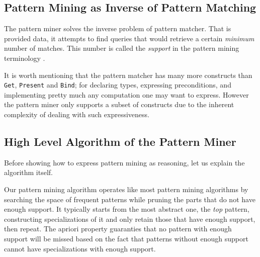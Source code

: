 \documentclass[runningheads]{llncs}
\begin{document}
\subsection{Pattern Mining as Inverse of Pattern Matching}

The pattern miner solves the inverse problem of pattern matcher. That
is provided data, it attempts to find queries that would retrieve a
certain \emph{minimum} number of matches. This number is called the
\emph{support} in the pattern mining terminology \cite{Chi2005Freq,
  Agrawal1994fastalgorithms}.

It is worth mentioning that the pattern matcher has many more
constructs than \texttt{Get}, \texttt{Present} and \texttt{Bind}; for
declaring types, expressing preconditions, and implementing pretty
much any computation one may want to express. However the pattern
miner only supports a subset of constructs due to the inherent
complexity of dealing with such expressiveness.

\subsection{High Level Algorithm of the Pattern Miner}

Before showing how to express pattern mining as reasoning, let us
explain the algorithm itself.

Our pattern mining algorithm operates like most pattern mining
algorithms \cite{Chi2005Freq} by searching the space of frequent
patterns while pruning the parts that do not have enough support. It
typically starts from the most abstract one, the \emph{top} pattern,
constructing specializations of it and only retain those that have
enough support, then repeat. The apriori property
\cite{Agrawal1994fastalgorithms} guaranties that no pattern with
enough support will be missed based on the fact that patterns without
enough support cannot have specializations with enough support.
\end{document}
